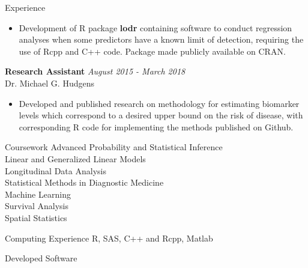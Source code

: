 \documentclass{resume} %
\begin{document}
\begin{rSection}{Experience}
\begin{itemize}
    \item Development of R package \textbf{lodr} containing software to conduct regression analyses when some predictors have a known limit of detection, requiring the use of Rcpp and C++ code.  Package made publicly available on CRAN.
\end{itemize}
{\bf Research Assistant} \hfill {\em August 2015 - March 2018} 
\\ Dr. Michael G. Hudgens
\begin{itemize}
    \item Developed and published research on methodology for estimating biomarker levels which correspond to a desired upper bound on the risk of disease, with corresponding R code for implementing the methods published on Github.
\end{itemize}

\end{rSection}

\begin{rSection}{Coursework}
Advanced Probability and Statistical Inference\\
Linear and Generalized Linear Models\\
Longitudinal Data Analysis\\
Statistical Methods in Diagnostic Medicine\\
Machine Learning\\
Survival Analysis\\
Spatial Statistics
\end{rSection}


\begin{rSection}{Computing Experience}
R, SAS, C++ and Rcpp, Matlab

\end{rSection}


\begin{rSection}{Developed Software}

\begin{refsection}
\nocite{*}
\leavevmode\printbibliography[omitnumbers=true,heading=none]
\end{refsection}

\end{rSection}
\end{document}
